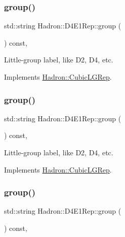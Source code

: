 \subsubsection{\texorpdfstring{group()}{group()}\hspace{0.1cm}{\footnotesize\ttfamily [3/5]}}
{\footnotesize\ttfamily std\+::string Hadron\+::\+D4\+E1\+Rep\+::group (\begin{DoxyParamCaption}{ }\end{DoxyParamCaption}) const\hspace{0.3cm}{\ttfamily [inline]}, {\ttfamily [virtual]}}

Little-\/group label, like D2, D4, etc. 

Implements \mbox{\hyperlink{structHadron_1_1CubicLGRep_a9bdb14b519a611d21379ed96a3a9eb41}{Hadron\+::\+Cubic\+L\+G\+Rep}}.

\mbox{\label{structHadron_1_1D4E1Rep_a84c3427320fdc63f26dbb3bf4ff86286}} 
\subsubsection{\texorpdfstring{group()}{group()}\hspace{0.1cm}{\footnotesize\ttfamily [4/5]}}
{\footnotesize\ttfamily std\+::string Hadron\+::\+D4\+E1\+Rep\+::group (\begin{DoxyParamCaption}{ }\end{DoxyParamCaption}) const\hspace{0.3cm}{\ttfamily [inline]}, {\ttfamily [virtual]}}

Little-\/group label, like D2, D4, etc. 

Implements \mbox{\hyperlink{structHadron_1_1CubicLGRep_a9bdb14b519a611d21379ed96a3a9eb41}{Hadron\+::\+Cubic\+L\+G\+Rep}}.

\mbox{\label{structHadron_1_1D4E1Rep_a84c3427320fdc63f26dbb3bf4ff86286}} 
\subsubsection{\texorpdfstring{group()}{group()}\hspace{0.1cm}{\footnotesize\ttfamily [5/5]}}
{\footnotesize\ttfamily std\+::string Hadron\+::\+D4\+E1\+Rep\+::group (\begin{DoxyParamCaption}{ }\end{DoxyParamCaption}) const\hspace{0.3cm}{\ttfamily [inline]}, {\ttfamily [virtual]}}

